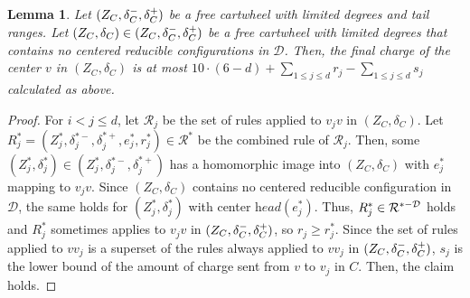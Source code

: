 \documentclass[10pt,a4paper]{article}
\newtheorem{lem}[thm]{Lemma}
\def\head{\textit{head}}
\begin{document}
\begin{lem}
\label{lem:estimate_charge_easy}
    Let $(Z_C, \delta_C^-, \delta_C^+)$ be a free cartwheel with limited degrees and tail ranges.
    Let $(Z_C, \delta_C) \in (Z_C, \delta_C^-, \delta_C^+)$ be a free cartwheel with limited degrees that contains no centered reducible configurations in $\mathcal{D}$.
    Then, the final charge of the center $v$ in $(Z_C, \delta_C)$ is at most $10 \cdot (6-d) + \sum_{1 \leq j \leq d} r_j - \sum_{1 \leq j \leq d} s_j$ calculated as above.
\end{lem}
\begin{proof}
    For $i < j \leq d$, let $\mathcal{R}_j$ be the set of rules applied to $v_jv$ in $(Z_C, \delta_C)$.
    Let $R^*_j = (Z^*_j, \delta_j^{*-}, \delta_j^{*+}, e_j^*, r_j^*) \in \mathcal{R}^*$ be the combined rule of $\mathcal{R}_j$.
    Then, some $(Z^*_j, \delta_j^*) \in (Z^*_j, \delta_j^{*-}, \delta_j^{*+})$ has a homomorphic image into $(Z_C, \delta_C)$ with $e_j^*$ mapping to $v_jv$.
    Since $(Z_C, \delta_C)$ contains no centered reducible configuration in $\mathcal{D}$, the same holds for $(Z^*_j, \delta_j^*)$ with center $\head(e_j^*)$.
    Thus, $R^*_j \in \mathcal{R}^{*-\mathcal{D}}$ holds and $R^*_j$ sometimes applies to $v_jv$ in $(Z_C, \delta_C^-, \delta_C^+)$, so $r_j \geq r^*_j$.
    Since the set of rules applied to $vv_j$ is a superset of the rules always applied to $vv_j$ in $(Z_C, \delta_C^-, \delta_C^+)$, $s_j$ is the lower bound of the amount of charge sent from $v$ to $v_j$ in $C$.
    Then, the claim holds.
\end{proof}
\end{document}
